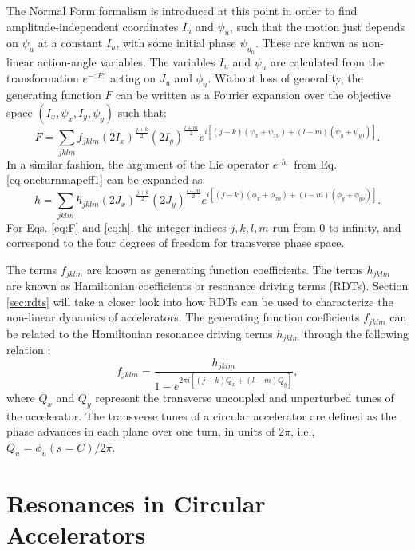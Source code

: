 The Normal Form formalism is introduced at this point in order to find amplitude-independent coordinates $I_u$ and $\psi_u$, such that the motion just depends on $\psi_u$ at a constant $I_u$, with some initial phase $\psi_{u_0}$. These are known as non-linear action-angle variables. The variables $I_u$ and $\psi_u$ are calculated from the transformation $e^{-:F:}$ acting on $J_u$ and $\phi_u$. Without loss of generality, the generating function $F$ can be written as a Fourier expansion over the objective space $(I_x,\psi_x,I_y,\psi_y)$ such that:
\begin{equation}
    \label{eq:F}
    F=\sum_{jklm} f_{jklm} \left( 2 I_x\right)^{\frac{j+k}{2}} \left( 2 I_y\right)^{\frac{l+m}{2}} e^{i\left[ \left( j-k \right)\left( \psi_x+\psi_{x0} \right)+ \left( l-m \right) \left( \psi_y+\psi_{y0} \right)\right]}.
\end{equation}
In a similar fashion, the argument of the Lie operator $e^{:h:}$ from Eq. \ref{eq:oneturnmapeff1} can be expanded as:
\begin{equation}
    \label{eq:h}
    h=\sum_{jklm} h_{jklm} \left( 2 J_x\right)^{\frac{j+k}{2}} \left( 2 J_y\right)^{\frac{l+m}{2}} e^{i\left[ \left( j-k \right)\left( \phi_x+\phi_{x0} \right)+ \left( l-m \right) \left( \phi_y+\phi_{y0} \right)\right]}.
\end{equation}
For Eqs. \ref{eq:F} and \ref{eq:h}, the integer indices $j,k,l,m$ run from $0$ to infinity, and correspond to the four degrees of freedom for transverse phase space.   

The terms $f_{jklm}$ are known as generating function coefficients. The terms $h_{jklm}$ are known as Hamiltonian coefficients or resonance driving terms (RDTs). Section \ref{sec:rdts} will take a closer look into how RDTs can be used to characterize the non-linear dynamics of accelerators. The generating function coefficients $f_{jklm}$ can be related to the Hamiltonian resonance driving terms $h_{jklm}$ through the following relation \cite{cernthesis1,bartolini}:
\begin{equation}
    \label{eq:handf}
    f_{jklm}=\frac{h_{jklm}}{1-e^{2\pi i \left[ \left( j-k \right) Q_x + \left( l-m\right) Q_y \right] }},
\end{equation}
where $Q_x$ and $Q_y$ represent the transverse uncoupled and unperturbed tunes of the accelerator. The transverse tunes of a circular accelerator are defined as the phase advances in each plane over one turn, in units of $2\pi$, i.e., $Q_u=\phi_u(s=C)/2\pi$. 

\section{Resonances in Circular Accelerators}

